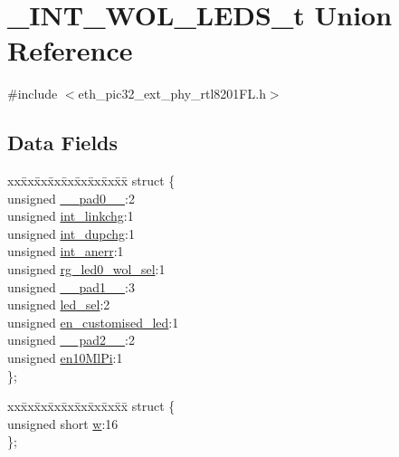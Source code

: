\hypertarget{union___i_n_t___w_o_l___l_e_d_s__t}{}\section{\+\_\+\+I\+N\+T\+\_\+\+W\+O\+L\+\_\+\+L\+E\+D\+S\+\_\+t Union Reference}
\label{union___i_n_t___w_o_l___l_e_d_s__t}


{\ttfamily \#include $<$eth\+\_\+pic32\+\_\+ext\+\_\+phy\+\_\+rtl8201\+F\+L.\+h$>$}

\subsection*{Data Fields}
\begin{DoxyCompactItemize}
\item 
\begin{tabbing}
xx\=xx\=xx\=xx\=xx\=xx\=xx\=xx\=xx\=\kill
struct \{\\
\>unsigned \hyperlink{union___i_n_t___w_o_l___l_e_d_s__t_adf71f3d8410c1f1dbbc96680a92c49af}{\_\_pad0\_\_}:2\\
\>unsigned \hyperlink{union___i_n_t___w_o_l___l_e_d_s__t_a386b3fd5b40085ce0114845fe40bcd75}{int\_linkchg}:1\\
\>unsigned \hyperlink{union___i_n_t___w_o_l___l_e_d_s__t_aacc515a22fbaaa4b196a0590f61fec03}{int\_dupchg}:1\\
\>unsigned \hyperlink{union___i_n_t___w_o_l___l_e_d_s__t_a2041712ddaa9b91900c0c92652956969}{int\_anerr}:1\\
\>unsigned \hyperlink{union___i_n_t___w_o_l___l_e_d_s__t_a2b8b02a6fc25bd1ae158cc0e124d5734}{rg\_led0\_wol\_sel}:1\\
\>unsigned \hyperlink{union___i_n_t___w_o_l___l_e_d_s__t_acaf2d0924a107ec6e8d2e31febaf66f9}{\_\_pad1\_\_}:3\\
\>unsigned \hyperlink{union___i_n_t___w_o_l___l_e_d_s__t_a0d0c6712d24dba9817cb9dab5f05d11b}{led\_sel}:2\\
\>unsigned \hyperlink{union___i_n_t___w_o_l___l_e_d_s__t_ace472d5c667ff6b47aa8b7f2b3248327}{en\_customised\_led}:1\\
\>unsigned \hyperlink{union___i_n_t___w_o_l___l_e_d_s__t_a4d97cc5f7d51d22fc2bf3eab35c9cb7f}{\_\_pad2\_\_}:2\\
\>unsigned \hyperlink{union___i_n_t___w_o_l___l_e_d_s__t_a7c87b30598fbab2d922a73c433fe944e}{en10MlPi}:1\\
\}; \\

\end{tabbing}\item 
\begin{tabbing}
xx\=xx\=xx\=xx\=xx\=xx\=xx\=xx\=xx\=\kill
struct \{\\
\>unsigned short \hyperlink{union___i_n_t___w_o_l___l_e_d_s__t_a160850a4684a3e82c2323033964f2e98}{w}:16\\
\}; \\

\end{tabbing}\end{DoxyCompactItemize}


